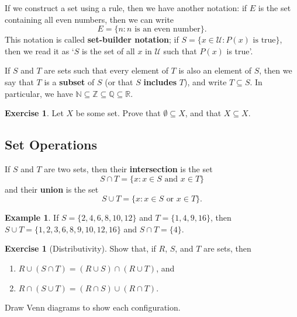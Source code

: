 \documentclass[a4paper,leqno]{article}
\numberwithin{equation}{section}
\theoremstyle{definition}
\newtheorem{ex}[equation]{Example}
\newtheorem{exercise}[equation]{Exercise}
\theoremstyle{remark}
\newcommand{\df}[1]{\textbf{#1}}
\begin{document}
If we construct a set using a rule, then we have another notation: if $ E $ is the set containing all even numbers, then we can write
\begin{equation}
  E = \{ n : n\text{ is an even number}\}.
\end{equation}
This notation is called \df{set-builder notation}; if $ S = \{ x \in \mathcal{U} : P(x) \text{ is true}\} $, then we read it
as `$ S $ is the set of all $ x $ in $ \mathcal{U} $ such that $ P(x) $ is true'.

If $ S $ and $ T $ are sets such that every element of $ T $ is also an element of $ S $, then we say that $ T $ is a \df{subset} of $ S $ (or
that $ S $ \df{includes} $ T $), and write $ T \subseteq S $. In particular, we have $ \mathbb{N} \subseteq \mathbb{Z} \subseteq \mathbb{Q} \subseteq \mathbb{R} $.
\begin{exercise}
  Let $ X $ be some set. Prove that $ \emptyset \subseteq X $, and that $ X \subseteq X $.
\end{exercise}

\subsection{Set Operations}
If $ S $ and $ T $ are two sets, then their \df{intersection} is the set
\begin{equation}
  S \cap T = \{ x : x \in S \text{ and } x \in T \}
\end{equation}
and their \df{union} is the set
\begin{equation}
  S \cup T = \{ x : x \in S \text{ or } x \in T \}.
\end{equation}

\begin{ex}
  If $ S = \{2, 4, 6, 8, 10, 12\} $ and $ T = \{1, 4, 9, 16\} $, then $ S \cup T = \{1,2,3,6,8,9,10,12,16\} $ and $ S \cap T = \{4\} $.
\end{ex}

\begin{exercise}[Distributivity]
  Show that, if $ R $, $ S $, and $ T $ are sets, then
  \begin{enumerate}
    \item $ R \cup (S \cap T) = (R \cup S) \cap (R \cup T) $, and
    \item $ R \cap (S \cup T) = (R \cap S) \cup (R \cap T) $.
  \end{enumerate}
  Draw Venn diagrams to show each configuration.
\end{exercise}
\end{document}
